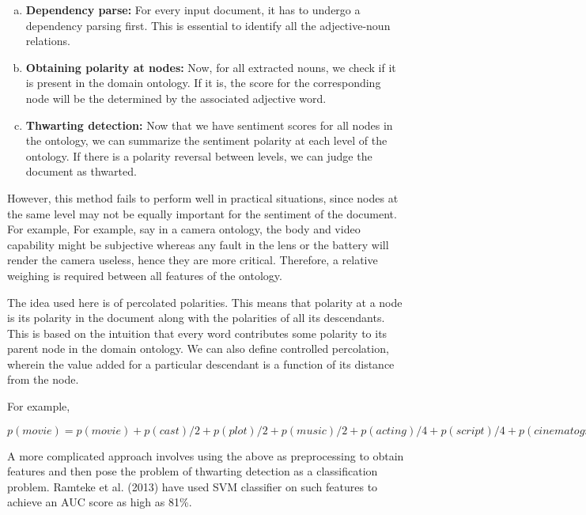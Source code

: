 \begin{enumerate}[(a)]%
\setlength{\itemsep}{15pt}
\item \textbf{Dependency parse: } For every input document, it has to undergo a dependency parsing first. This is essential to identify all the adjective-noun relations.

\item \textbf{Obtaining polarity at nodes: } Now, for all extracted nouns, we check if it is present in the domain ontology. If it is, the score for the corresponding node
will be the determined by the associated adjective word. 

\item \textbf{Thwarting detection: } Now that we have sentiment scores for all nodes in the ontology, we can summarize the sentiment polarity at each level of the ontology.
If there is a polarity reversal between levels, we can judge the document as thwarted.

\end{enumerate} 

\vspace{8mm}

However, this method fails to perform well in practical situations, since nodes at the same level may not be equally important for the sentiment of the document. For example,
For example, say in a camera ontology, the body and video capability might be subjective whereas any fault in the lens or the battery will render the camera useless, hence they are more critical.
Therefore, a relative weighing is required between all features of the ontology.

\vspace{8mm}

The idea used here is of percolated polarities. This means that polarity at a node is its polarity in the document along with the polarities of
all its descendants. This is based on the intuition that every word contributes some polarity to its parent node in the domain ontology. We can also define controlled
percolation, wherein the value added for a particular descendant is a function of its distance from the node.

\vspace{8mm}

For example,

\begin{framed}
$p(movie) = p(movie) + p(cast)/2 +p(plot)/2 + p(music)/2 + p(acting)/4 + p(script)/4 + p(cinematography)/4$
\end{framed}

A more complicated approach involves using the above as preprocessing to obtain features and then pose the problem of thwarting detection as a classification problem. 
Ramteke et al. (2013) have used SVM classifier on such features to achieve an AUC score as high as 81\%. 
